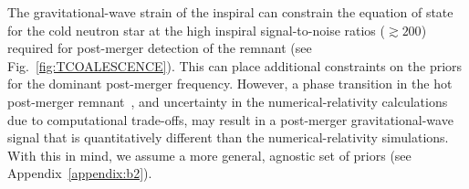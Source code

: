 \documentclass[../Thesis.tex]{subfiles}
\begin{document}
    The gravitational-wave strain of the inspiral can constrain the equation of state for the cold neutron star at the high inspiral signal-to-noise ratios ($\gtrsim 200$) required for post-merger detection of the remnant (see Fig.~\ref{fig:TCOALESCENCE}). 
    This can place additional constraints on the priors for the dominant post-merger frequency. 
    However, a phase transition in the hot post-merger remnant~\cite{Most2018b,Most2018,Bauswein2019}, and uncertainty in the numerical-relativity calculations due to computational trade-offs, may result in a post-merger gravitational-wave signal that is quantitatively different than the  numerical-relativity simulations.
    With this in mind, we assume a more general, agnostic set of priors (see Appendix~\ref{appendix:b2}).
    \par
 
\end{document}
